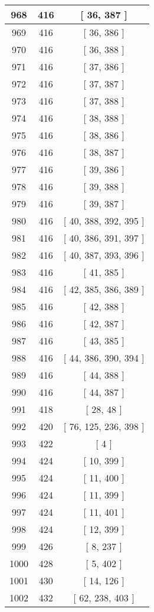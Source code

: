 \begin{center}
\begin{longtable}[H]{|| c c c ||}
968 & 416 & [ 36, 387 ]
\\\hline
969 & 416 & [ 36, 386 ]
\\\hline
970 & 416 & [ 36, 388 ]
\\\hline
971 & 416 & [ 37, 386 ]
\\\hline
972 & 416 & [ 37, 387 ]
\\\hline
973 & 416 & [ 37, 388 ]
\\\hline
974 & 416 & [ 38, 388 ]
\\\hline
975 & 416 & [ 38, 386 ]
\\\hline
976 & 416 & [ 38, 387 ]
\\\hline
977 & 416 & [ 39, 386 ]
\\\hline
978 & 416 & [ 39, 388 ]
\\\hline
979 & 416 & [ 39, 387 ]
\\\hline
980 & 416 & [ 40, 388, 392, 395 ]
\\\hline
981 & 416 & [ 40, 386, 391, 397 ]
\\\hline
982 & 416 & [ 40, 387, 393, 396 ]
\\\hline
983 & 416 & [ 41, 385 ]
\\\hline
984 & 416 & [ 42, 385, 386, 389 ]
\\\hline
985 & 416 & [ 42, 388 ]
\\\hline
986 & 416 & [ 42, 387 ]
\\\hline
987 & 416 & [ 43, 385 ]
\\\hline
988 & 416 & [ 44, 386, 390, 394 ]
\\\hline
989 & 416 & [ 44, 388 ]
\\\hline
990 & 416 & [ 44, 387 ]
\\\hline
991 & 418 & [ 28, 48 ]
\\\hline
992 & 420 & [ 76, 125, 236, 398 ]
\\\hline
993 & 422 & [ 4 ]
\\\hline
994 & 424 & [ 10, 399 ]
\\\hline
995 & 424 & [ 11, 400 ]
\\\hline
996 & 424 & [ 11, 399 ]
\\\hline
997 & 424 & [ 11, 401 ]
\\\hline
998 & 424 & [ 12, 399 ]
\\\hline
999 & 426 & [ 8, 237 ]
\\\hline
1000 & 428 & [ 5, 402 ]
\\\hline
1001 & 430 & [ 14, 126 ]
\\\hline
1002 & 432 & [ 62, 238, 403 ]
\\\hline

\end{longtable}
\end{center}
